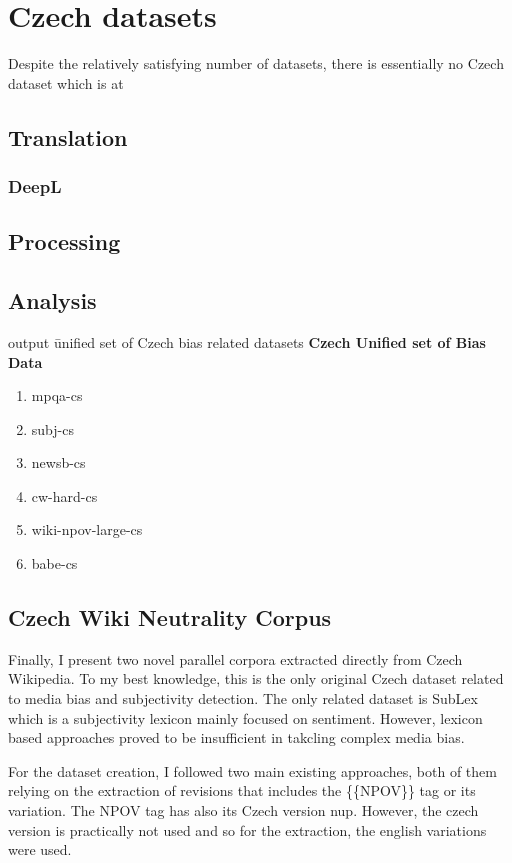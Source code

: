 \chapter{Czech datasets}
Despite the relatively satisfying number of datasets, there is essentially no Czech dataset which is at 
\section{Translation}
\subsection{DeepL}
\section{Processing}
\section{Analysis}
output \= unified set of Czech bias related datasets
\textbf{Czech Unified set of Bias Data}
\begin{enumerate}
    \item mpqa-cs
    \item subj-cs
    \item newsb-cs
    \item cw-hard-cs
    \item wiki-npov-large-cs
    \item babe-cs
\end{enumerate}

\newpage

\section{Czech Wiki Neutrality Corpus}
Finally, I present two novel parallel corpora extracted directly from Czech Wikipedia. To my best knowledge, this is the only original Czech dataset related to media bias and subjectivity detection. The only related dataset is SubLex which is a subjectivity lexicon mainly focused on sentiment. However, lexicon based approaches proved to be insufficient in takcling complex media bias.

For the dataset creation, I followed two main existing approaches, both of them relying on the extraction of revisions that includes the \{\{NPOV\}\} tag or its variation. The NPOV tag has also its Czech version \Gls{nup}. However, the czech version is practically not used and so for the extraction, the english variations were used.

